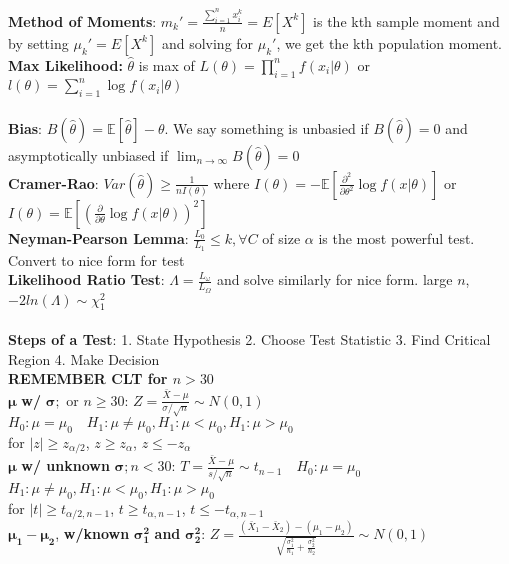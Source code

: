 \documentclass[answers,12pt,addpoints]{exam}
\begin{document}
\textbf{Method of Moments}: $m_k' = \frac{\sum_{i=1}^{n} x_i^k}{n} = E[X^k]$ is the kth sample moment and by setting $\mu_k' = E[X^k]$ and solving for $\mu_k'$, we get the kth population moment.\\
\textbf{Max Likelihood:} $\hat{\theta}$ is max of $L(\theta) = \prod_{i=1}^n f(x_i|\theta)$ or $l(\theta) = \sum_{i=1}^n \log f(x_i|\theta)$\\\\
\textbf{Bias}: $B(\hat{\theta}) = \mathbb{E}[\hat{\theta}] - \theta$. We say something is unbasied if $B(\hat{\theta}) = 0$ and asymptotically unbiased if $\lim_{n\to\infty} B(\hat{\theta}) = 0$\\
\textbf{Cramer-Rao}: $Var(\hat{\theta}) \geq \frac{1}{nI(\theta)}$ where $I(\theta) = -\mathbb{E}\left[\frac{\partial^2}{\partial \theta^2}\log f(x|\theta)\right]$ or $I(\theta) = \mathbb{E}\left[\left(\frac{\partial}{\partial \theta}\log f(x|\theta)\right)^2\right]$\\
\textbf{Neyman-Pearson Lemma}: $\frac{L_0}{L_1} \leq k, \forall C$ of size $\alpha$ is the most powerful test. Convert to nice form for test\\
\textbf{Likelihood Ratio Test}: $\Lambda = \frac{L_{\omega}}{L_{\Omega}}$ and solve similarly for nice form. large $n$, $-2ln(\Lambda) \sim \chi^2_1$\\\\
\textbf{Steps of a Test}: 1. State Hypothesis 2. Choose Test Statistic 3. Find Critical Region 4. Make Decision\\
\textbf{REMEMBER CLT for $n>30$}\\
$\boldsymbol{\mu}$ \textbf{w/} $\boldsymbol{\sigma};$ or $n \geq 30$: $Z = \frac{\bar{X} - \mu}{\sigma/\sqrt{n}} \sim N(0,1)$\\
$H_0: \mu = \mu_0 \quad H_1: \mu \neq \mu_0, H_1: \mu < \mu_0, H_1: \mu > \mu_0$\\
for $|z| \geq z_{\alpha/2}$, $z \geq z_{\alpha}$, $z \leq -z_{\alpha}$\\
$\boldsymbol{\mu}$ \textbf{w/ unknown} $\boldsymbol{\sigma}; n<30 $: $T = \frac{\bar{X} - \mu}{s/\sqrt{n}} \sim t_{n-1} \quad H_0: \mu = \mu_0$\\
$H_1: \mu \neq \mu_0, H_1: \mu < \mu_0, H_1: \mu > \mu_0$\\
for $|t| \geq t_{\alpha/2, n-1}$, $t \geq t_{\alpha, n-1}$, $t \leq -t_{\alpha, n-1}$\\ 
$\boldsymbol{\mu_1 - \mu_2}$, \textbf{w/known} $\boldsymbol{\sigma_1^2}$ \textbf{and} $\boldsymbol{\sigma_2^2}$: $Z = \frac{(\bar{X}_1 - \bar{X}_2) - (\mu_1 - \mu_2)}{\sqrt{\frac{\sigma_1^2}{n_1} + \frac{\sigma_2^2}{n_2}}} \sim N(0,1)$\\
\end{document}
